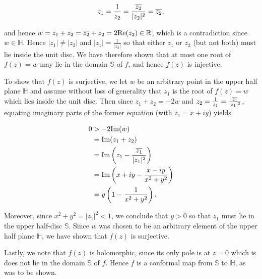 \begin{solution}
  $$
  z_1 = \frac{1}{z_2} = \frac{\overline{z_2}}{|z_2|^2} = \overline{z_2},
  $$

  and hence $w = z_1 + z_2 = \overline{z_2} + z_2 = 2 \text{Re}(z_2) \in \mathbb{R}$, which is a contradiction since 
  $w \in \mathbb{H}$. Hence $|z_1| \neq |z_2|$ and $|z_1| = \frac{1}{|z_2|}$ so that either $z_1$ or $z_2$ (but not 
  both) must lie inside the unit disc. We have therefore shown that at most one root of $f(z) = w$ may lie in the domain
  $\mathbb{S}$ of $f$, and hence $f(z)$ is injective.

  To show that $f(z)$ is surjective, we let $w$ be an arbitrary point in the upper half plane $\mathbb{H}$ and assume 
  without loss of generality that $z_1$ is the root of $f(z) = w$ which lies inside the unit disc. Then since 
  $z_1 + z_2 = -2w$ and $z_2 = \frac{1}{z_1} = \frac{\overline{z_1}}{|z_1|^2}$, equating imaginary parts of the former equation (with $z_1 = x + iy$) yields

  \begin{align*}
    0 &> -2 \text{Im}(w) \\
      &= \text{Im}(z_1 + z_2)  \\
      &= \text{Im}\left( z_1 - \frac{\overline{z_1}}{|z_1|^2} \right) \\
      &= \text{Im}\left( x + iy - \frac{x - iy}{x^2 + y^2} \right) \\
      &= y\left(1 - \frac{1}{x^2 + y^2} \right).
  \end{align*}

  Moreover, since $x^2 + y^2 = |z_1|^2 < 1$, we conclude that $y > 0$ so that $z_1$ must lie in the upper half-disc 
  $\mathbb{S}$. Since $w$ was chosen to be an arbitrary element of the upper half plane $\mathbb{H}$, we have shown that 
  $f(z)$ is surjective.

  Lastly, we note that $f(z)$ is holomorphic, since its only pole is at $z = 0$ which is does not lie in the domain 
  $\mathbb{S}$ of $f$. Hence $f$ is a conformal map from $\mathbb{S}$ to $\mathbb{H}$, as was to be shown.
  \ \\
\end{solution}
